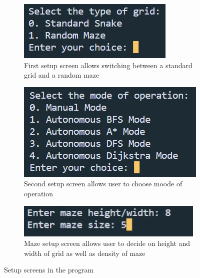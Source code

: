 \documentclass[11pt]{article}
\begin{document}
\begin{figure}[H]

\begin{subfigure}{0.3\textwidth}
    \includegraphics[scale=0.7]{Setup_1} 
    \caption{First setup screen allows switching between a standard grid and a random maze}
    \label{fig:subim1}
\end{subfigure}
\begin{subfigure}{0.3\textwidth}
    \includegraphics[scale=0.7]{Setup_2}
    \caption{Second setup screen allows user to choose moode of operation}
    \label{fig:subim2}
\end{subfigure}
\begin{subfigure}{0.3\textwidth}
    \includegraphics[scale=0.7]{Maze_Generation}
    \caption{Maze setup screen allows user to decide on height and width of grid as well as density of maze}
    \label{fig:subim3}
\end{subfigure}

\caption{Setup screens in the program}
\label{fig:image1}
\end{figure}
\end{document}
